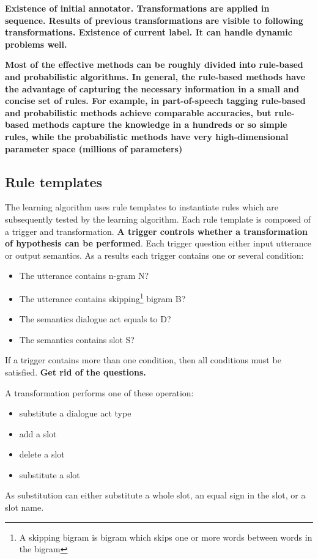 \documentclass[11pt]{article}
\begin{document}
\textbf{
Existence of initial annotator.
Transformations are applied in sequence. 
Results of previous transformations are visible to following transformations.
Existence of current label.
It can handle dynamic problems well.
}

\textbf{Most of the effective methods can be roughly divided into rule-based and probabilistic algorithms. In general, the rule-based methods have the advantage of capturing the necessary information in a small and concise set of rules. For example, in part-of-speech tagging rule-based and probabilistic methods achieve comparable accuracies, but rule-based methods capture the knowledge in a hundreds or so simple rules, while the probabilistic methods have very high-dimensional parameter space (millions of parameters)}

\subsection{Rule templates}
The learning algorithm uses rule templates to instantiate rules which are subsequently tested by the learning algorithm. Each rule template is composed of a trigger and transformation. \textbf{A trigger controls whether a transformation of hypothesis can be performed}. Each trigger question either input utterance or output semantics. As a results each trigger contains one or several condition:
\begin{itemize}
  \item The utterance contains n-gram N?
  \item The utterance contains skipping\footnote{A skipping bigram is bigram which skips one or more words between words in the bigram} bigram B?
  \item The semantics dialogue act equals to D?
  \item The semantics contains slot S?
\end{itemize}
If a trigger contains more than one condition, then all conditions must be satisfied. \textbf{Get rid of the questions.}

A transformation performs one of these operation:
\begin{itemize}
  \item substitute a dialogue act type
  \item add a slot
  \item delete a slot
  \item substitute a slot
\end{itemize}
As substitution can either substitute a whole slot, an equal sign in the slot, or a slot name.
\end{document}
